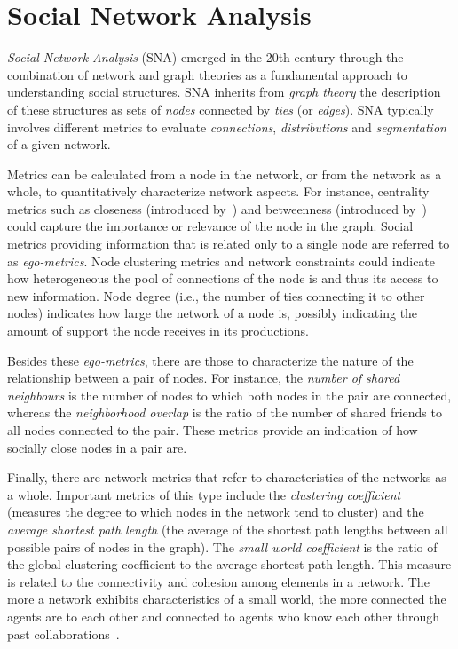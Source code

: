 \section{Social Network Analysis}
\label{sec:fundamentals:social}

\textit{Social Network Analysis} (SNA) emerged in the 20th century through the
combination of network and graph theories as a fundamental approach to
understanding social structures. SNA inherits from \textit{graph theory} the
description of these structures as sets of \textit{nodes} connected by
\textit{ties} (or \textit{edges}). SNA typically involves different metrics to
evaluate \textit{connections}, \textit{distributions} and \textit{segmentation}
of a given network.

Metrics can be calculated from a node in the network, or from the network as a
whole, to quantitatively characterize network aspects. For instance, centrality
metrics such as closeness (introduced by~\cite{bavelas}) and betweenness
(introduced by~\cite{anthonisse1971rush}) could capture the importance or
relevance of the node in the graph. Social metrics providing information that
is related only to a single node are referred to as \textit{ego-metrics}. Node
clustering metrics \citep{Holland01051971} and network constraints
\citep{Burt04} could indicate how heterogeneous the pool of connections of the
node is and thus its access to new information. Node degree (i.e., the number
of ties connecting it to other nodes) indicates how large the network of a node
is, possibly indicating the amount of support the node receives in its
productions.

Besides these \textit{ego-metrics}, there are those to characterize the nature
of the relationship between a pair of nodes. For instance, the \textit{number
of shared neighbours} is the number of nodes to which both nodes in the pair
are connected, whereas the \textit{neighborhood overlap} is the ratio of the
number of shared friends to all nodes connected to the pair. These metrics
provide an indication of how socially close nodes in a pair are.

Finally, there are network metrics that refer to characteristics of the
networks as a whole. Important metrics of this type include the
\textit{clustering coefficient} (measures the degree to which nodes in the
network tend to cluster) and the \textit{average shortest path length} (the
average of the shortest path lengths between all possible pairs of nodes in the
graph). The \textit{small world coefficient} is the ratio of the global
clustering coefficient to the average shortest path length. This measure is
related to the connectivity and cohesion among elements in a network. The more
a network exhibits characteristics of a small world, the more connected the
agents are to each other and connected to agents who know each other through
past collaborations~\citep{uzzi2005collaboration}.

